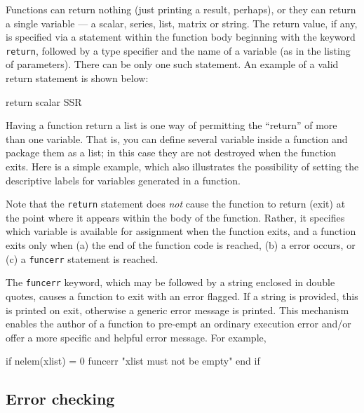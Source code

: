 Functions can return nothing (just printing a result, perhaps), or
they can return a single variable --- a scalar, series, list, matrix
or string.  The return value, if any, is specified via a statement
within the function body beginning with the keyword \verb+return+,
followed by a type specifier and the name of a variable (as in the
listing of parameters).  There can be only one such statement.  An
example of a valid return statement is shown below:
%    
\begin{code}
return scalar SSR
\end{code}
%
Having a function return a list is one way of permitting the
``return'' of more than one variable.  That is, you can define several
variable inside a function and package them as a list; in this case
they are not destroyed when the function exits.  Here is a simple
example, which also illustrates the possibility of setting the
descriptive labels for variables generated in a function.
%    

Note that the \verb+return+ statement does \emph{not} cause the
function to return (exit) at the point where it appears within the
body of the function. Rather, it specifies which variable is available
for assignment when the function exits, and a function exits only when
(a) the end of the function code is reached, (b) a  error
occurs, or (c) a \verb+funcerr+ statement is reached.

The \verb+funcerr+ keyword, which may be followed by a string enclosed
in double quotes, causes a function to exit with an error flagged.  If
a string is provided, this is printed on exit, otherwise a generic
error message is printed.  This mechanism enables the author of a
function to pre-empt an ordinary execution error and/or offer a more
specific and helpful error message.  For example,
%
\begin{code}
if nelem(xlist) = 0
   funcerr "xlist must not be empty"
end if
\end{code}
    

\subsection{Error checking}


